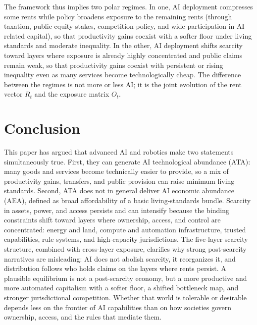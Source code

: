 \documentclass[11pt]{article}
\begin{document}
The framework thus implies two polar regimes. In one, AI deployment compresses some rents while policy broadens exposure to the remaining rents (through taxation, public equity stakes, competition policy, and wide participation in AI-related capital), so that productivity gains coexist with a softer floor under living standards and moderate inequality. In the other, AI deployment shifts scarcity toward layers where exposure is already highly concentrated and public claims remain weak, so that productivity gains coexist with persistent or rising inequality even as many services become technologically cheap. The difference between the regimes is not more or less AI; it is the joint evolution of the rent vector \(R_t\) and the exposure matrix \(O_t\).

\section{Conclusion}
\label{sec:conclusion}

This paper has argued that advanced AI and robotics make two statements simultaneously true. First, they can generate AI technological abundance (ATA): many goods and services become technically easier to provide, so a mix of productivity gains, transfers, and public provision can raise minimum living standards. Second, ATA does not in general deliver AI economic abundance (AEA), defined as broad affordability of a basic living-standards bundle. Scarcity in assets, power, and access persists and can intensify because the binding constraints shift toward layers where ownership, access, and control are concentrated: energy and land, compute and automation infrastructure, trusted capabilities, rule systems, and high-capacity jurisdictions. The five-layer scarcity structure, combined with cross-layer exposure, clarifies why strong post-scarcity narratives are misleading: AI does not abolish scarcity, it reorganizes it, and distribution follows who holds claims on the layers where rents persist. A plausible equilibrium is not a post-scarcity economy, but a more productive and more automated capitalism with a softer floor, a shifted bottleneck map, and stronger jurisdictional competition. Whether that world is tolerable or desirable depends less on the frontier of AI capabilities than on how societies govern ownership, access, and the rules that mediate them.
\end{document}
